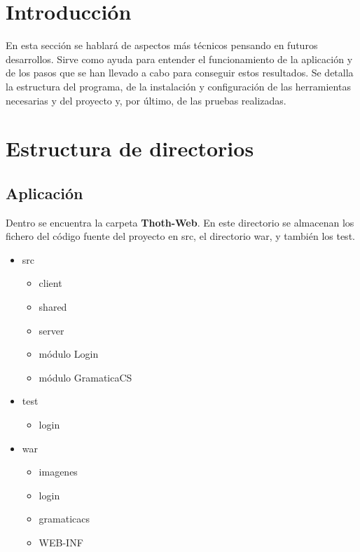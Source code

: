
\section{Introducción}

En esta sección se hablará de aspectos más técnicos pensando en futuros desarrollos. Sirve como ayuda para entender el funcionamiento de la aplicación y de los pasos que se han llevado a cabo para conseguir estos resultados. Se detalla la estructura del programa, de la instalación y configuración de las herramientas necesarias y del proyecto y, por último, de las pruebas realizadas.

\section{Estructura de directorios}


\subsection{Aplicación}
Dentro se encuentra la carpeta \textbf{Thoth-Web}. En este directorio se almacenan los fichero del código fuente del proyecto en src, el directorio war, y también los test.

\begin{itemize}
	\item src
		\begin{itemize}
			\item client
			\item shared
			\item server
			\item módulo Login
			\item módulo GramaticaCS
		\end{itemize}
	\item test
		\begin{itemize}
			\item login
			
		\end{itemize}
	\item war
		\begin{itemize}
			\item imagenes
			\item login
			\item gramaticacs
			\item WEB-INF
		\end{itemize}
\end{itemize}	

